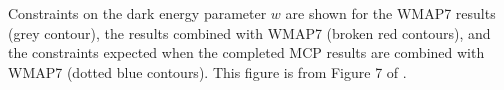 \label{fig:h20_H0_w} Constraints on the dark energy parameter $w$ are shown for the WMAP7 results (grey contour), the \citet{reid2013_mmproject_IV} results combined with WMAP7 (broken red contours), and the constraints expected when the completed MCP results are combined with WMAP7 (dotted blue contours). This figure is from Figure 7 of \citet{reid2013_mmproject_IV}.